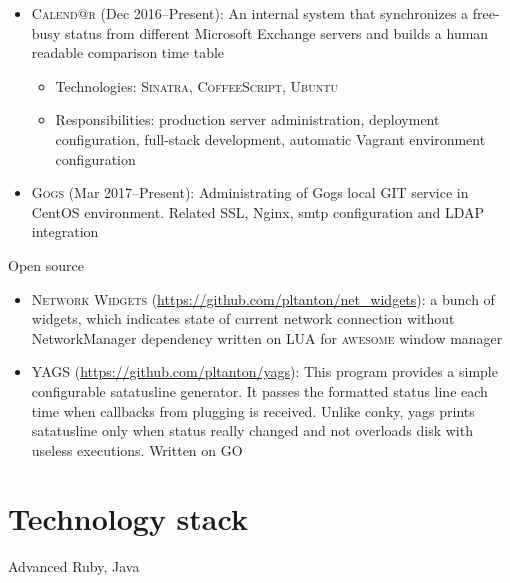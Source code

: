 \documentclass{cv}
\begin{document}
\begin{cvblock}{%
  }
\begin{itemize}
    \item \textsc{Calend@r} (Dec 2016--Present):
      An internal system that synchronizes a free-busy status from different
      Microsoft Exchange servers and builds a human readable comparison time
      table
      \begin{itemize}
        \item Technologies: \textsc{Sinatra}, \textsc{CoffeeScript},
          \textsc{Ubuntu}
        \item Responsibilities: production server administration, deployment
          configuration, full-stack development, automatic Vagrant environment
          configuration
      \end{itemize}
    \item \textsc{Gogs} (Mar 2017--Present):
      Administrating of Gogs local GIT service in CentOS environment. Related
      SSL, Nginx, smtp configuration and LDAP integration

  \end{itemize}
\end{cvblock}

\vspace{2em}

\begin{cvblock}{Open source}
  \begin{itemize}
    \item \textsc{Network Widgets}
      (\url{https://github.com/pltanton/net_widgets}):
			a bunch of widgets, which indicates state of current network connection
      without NetworkManager dependency written on \textsc{LUA} for
      \textsc{awesome} window manager
    \item \textsc{YAGS}
      (\url{https://github.com/pltanton/yags}):
      This program provides a simple configurable satatusline generator. It
      passes the formatted status line each time when callbacks from plugging
      is received. Unlike conky, yags prints satatusline only when status
      really changed and not overloads disk with useless executions. Written on
      \textsc{GO}

  \end{itemize}
\end{cvblock}

\section{Technology stack}

\begin{cvblock}{Advanced}
  Ruby, Java
\end{cvblock}
\end{document}
